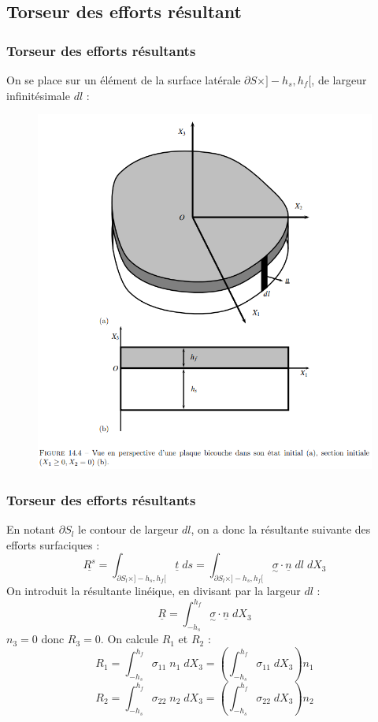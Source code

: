 \subsection{Torseur des efforts résultant}

\begin{frame}
    \frametitle{Torseur des efforts résultants}
    On se place sur un élément de la surface latérale $\partial S \times ]-h_s,h_f[$, de largeur infinitésimale $dl$ :
    \begin{figure}
        \centering
        \includegraphics[scale=0.5]{imgs/surface_etude.png}
    \end{figure}
\end{frame}

\begin{frame}
    \frametitle{Torseur des efforts résultants}
    En notant $\partial S_l$ le contour de largeur $dl$, on a donc la résultante suivante des efforts surfaciques :
    $$\underline{R^{s}} = \int_{\partial S_l \times ]-h_s,h_f[}\underline{t}\;ds = \int_{\partial S_l \times ]-h_s,h_f[}\underset{\sim}{\sigma}\cdot\underline{n}\;dl\;dX_3$$
    On introduit la résultante linéique, en divisant par la largeur $dl$ :
    $$\underline{R} = \int_{-h_s}^{h_f}\underset{\sim}{\sigma}\cdot\underline{n}\;dX_3$$
    $n_3 = 0$ donc $R_3 = 0$. On calcule $R_1$ et $R_2$ :
    $$R_1 = \int_{-h_s}^{h_f}\sigma_{11}\;n_1\;dX_3 = (\int_{-h_s}^{h_f}\sigma_{11}\;dX_3)n_1$$
    $$R_2 = \int_{-h_s}^{h_f}\sigma_{22}\;n_2\;dX_3 = (\int_{-h_s}^{h_f}\sigma_{22}\;dX_3)n_2$$
\end{frame}


